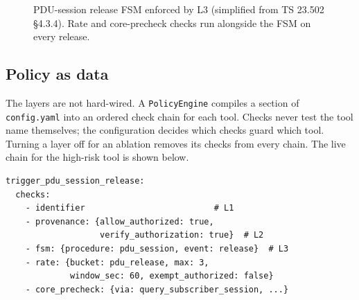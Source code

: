 \documentclass[conference]{IEEEtran}
\newcommand{\code}[1]{\texttt{\small #1}}
\begin{document}
\begin{figure}[t]
\centering
{}
\caption{PDU-session release FSM enforced by L3 (simplified from TS 23.502 \S4.3.4). Rate and core-precheck
checks run alongside the FSM on every release.}
\label{fig:fsm}
\end{figure}

\subsection{Policy as data}
The layers are not hard-wired. A \code{PolicyEngine} compiles a section of
\code{config.yaml} into an ordered check chain for each tool. Checks never test the tool
name themselves; the configuration decides which checks guard which tool. Turning a layer
off for an ablation removes its checks from every chain. The live chain for the high-risk
tool is shown below.

\begin{lstlisting}
trigger_pdu_session_release:
  checks:
    - identifier                          # L1
    - provenance: {allow_authorized: true,
                   verify_authorization: true}  # L2
    - fsm: {procedure: pdu_session, event: release}  # L3
    - rate: {bucket: pdu_release, max: 3,
             window_sec: 60, exempt_authorized: false}
    - core_precheck: {via: query_subscriber_session, ...}
\end{lstlisting}
\end{document}
